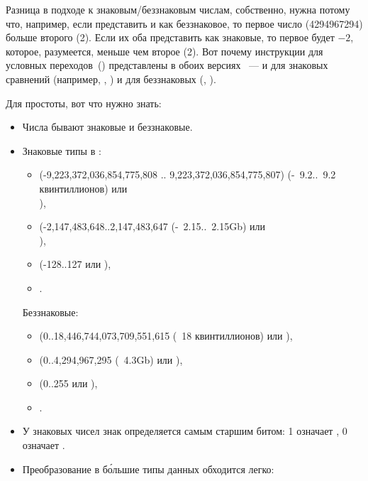 Разница в подходе к знаковым/беззнаковым числам, собственно, нужна потому что, например, 
если представить  и  как беззнаковое, то первое число (4294967294) больше второго (2). 
Если их оба представить как знаковые, то первое будет $-2$, которое, разумеется, меньше чем второе (2).
Вот почему инструкции для условных переходов~() представлены в обоих версиях ~--- 
и для знаковых сравнений (например, \JG, \JL) и для беззнаковых (\JA, \JB).

Для простоты, вот что нужно знать:

\begin{itemize}
\item Числа бывают знаковые и беззнаковые.

\item Знаковые типы в \CCpp:

  \begin{itemize}
    \item {} (-9,223,372,036,854,775,808 .. 9,223,372,036,854,775,807) 
	  (-~9.2..~9.2 квинтиллионов) или \\
                ),
    \item \Tint (-2,147,483,648..2,147,483,647 (-~2.15..~2.15Gb) или \\
	    ),
    \item \Tchar (-128..127 или ),
    \item {}.
   \end{itemize}

	Беззнаковые:
  \begin{itemize}
	  \item {} (0..18,446,744,073,709,551,615 
		  (~18 квинтиллионов) или ),
   \item {} (0..4,294,967,295 (~4.3Gb) или ),
   \item {} (0..255 или ), 
   \item {}.
  \end{itemize}

\item У знаковых чисел знак определяется самым старшим битом: 1 означает , 0 означает .

\item Преобразование в б\'{о}льшие типы данных обходится легко:


\end{itemize}
